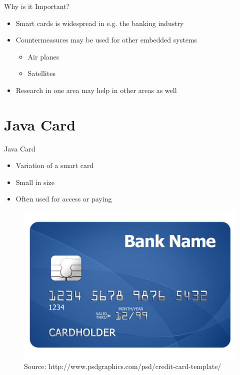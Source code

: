 
\begin{frame}{Why is it Important?}
\begin{itemize}
\item Smart cards is widespread in e.g. the banking industry
\item Countermeasures may be used for other embedded systems
  \begin{itemize}
  \item Air planes
  \item Satellites 
  \end{itemize}
\item Research in one area may help in other areas as well
\end{itemize}  
\end{frame}



\section{Java Card}
\label{sec:java-card}
\begin{frame}{Java Card}
  \begin{itemize}
  \item Variation of a smart card
  \item Small in size
  \item Often used for access or paying
  \end{itemize}
\begin{figure}[h]
  \centering
  \includegraphics[scale=.03]{credit-card}
  \caption{Source: http://www.psdgraphics.com/psd/credit-card-template/}
\end{figure}
\end{frame}


